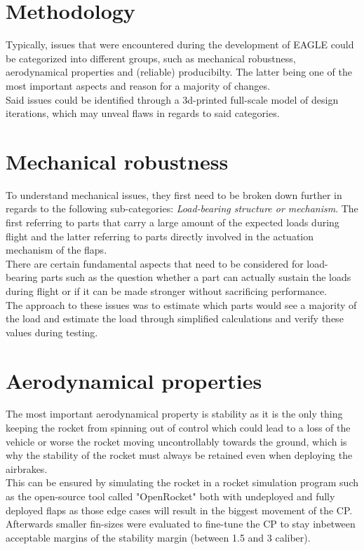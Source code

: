\documentclass[fontsize=11pt,%
twoside,%
BCOR          = 8mm, %
DIV           = 11,  %
titlepage     = off,%
index=totoc,%
xcolor        = pdftex,%
dvipsnames,%
bibliography  = totoc,%
bibliography = numbered, %
listof        = notnumbered]{scrreprt}
\begin{document}
\section{Methodology}
Typically, issues  that were encountered during the development of EAGLE could be categorized into different groups, such as mechanical robustness, aerodynamical properties and (reliable) producibilty. The latter being one of the most important aspects and reason for a majority of changes.\\
Said issues could be identified through a 3d-printed full-scale model of design iterations, which may unveal flaws in regards to said categories.

\section{Mechanical robustness}
To understand mechanical issues, they first need to be broken down further in regards to the following sub-categories: \textit{Load-bearing structure or mechanism}. The first referring to parts that carry a large amount of the expected loads during flight and the latter referring to parts directly involved in the actuation mechanism of the flaps.\\
There are certain fundamental aspects that need to be considered for load-bearing parts such as the question whether a part can actually sustain the loads during flight or if it can be made stronger without sacrificing performance. \\
The approach to these issues was to estimate which parts would see a majority of the load and estimate the load through simplified calculations and verify these values during testing.

\section{Aerodynamical properties}
The most important aerodynamical property is stability as it is the only thing keeping the rocket from spinning out of control which could lead to a loss of the vehicle or worse the rocket moving uncontrollably towards the ground, which is why the stability of the rocket must always be retained even when deploying the airbrakes.\\
This can be ensured by simulating the rocket in a rocket simulation program such as the open-source tool called "OpenRocket" both with undeployed and fully deployed flaps as those edge cases will result in the biggest movement of the CP. Afterwards smaller fin-sizes were evaluated to fine-tune the CP to stay inbetween acceptable margins of the stability margin (between 1.5 and 3 caliber).
\end{document}
